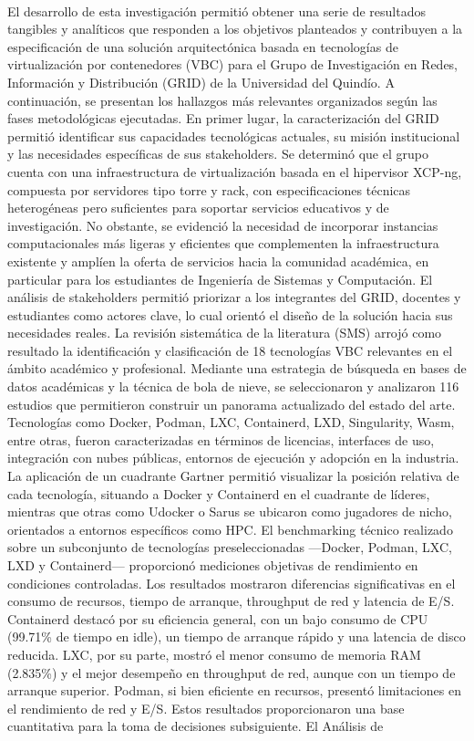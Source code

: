 \label{cap:resultados}
\mbox{}\\
El desarrollo de esta investigación permitió obtener una serie de resultados tangibles y analíticos que responden a los objetivos planteados y contribuyen a la especificación de una solución arquitectónica basada en tecnologías de virtualización por contenedores (VBC) para el Grupo de Investigación en Redes, Información y Distribución (GRID) de la Universidad del Quindío. A continuación, se presentan los hallazgos más relevantes organizados según las fases metodológicas ejecutadas. En primer lugar, la caracterización del GRID permitió identificar sus capacidades tecnológicas actuales, su misión institucional y las necesidades específicas de sus stakeholders. Se determinó que el grupo cuenta con una infraestructura de virtualización basada en el hipervisor XCP-ng, compuesta por servidores tipo torre y rack, con especificaciones técnicas heterogéneas pero suficientes para soportar servicios educativos y de investigación. No obstante, se evidenció la necesidad de incorporar instancias computacionales más ligeras y eficientes que complementen la infraestructura existente y amplíen la oferta de servicios hacia la comunidad académica, en particular para los estudiantes de Ingeniería de Sistemas y Computación. El análisis de stakeholders permitió priorizar a los integrantes del GRID, docentes y estudiantes como actores clave, lo cual orientó el diseño de la solución hacia sus necesidades reales. La revisión sistemática de la literatura (SMS) arrojó como resultado la identificación y clasificación de 18 tecnologías VBC relevantes en el ámbito académico y profesional. Mediante una estrategia de búsqueda en bases de datos académicas y la técnica de bola de nieve, se seleccionaron y analizaron 116 estudios que permitieron construir un panorama actualizado del estado del arte. Tecnologías como Docker, Podman, LXC, Containerd, LXD, Singularity, Wasm, entre otras, fueron caracterizadas en términos de licencias, interfaces de uso, integración con nubes públicas, entornos de ejecución y adopción en la industria. La aplicación de un cuadrante Gartner permitió visualizar la posición relativa de cada tecnología, situando a Docker y Containerd en el cuadrante de líderes, mientras que otras como Udocker o Sarus se ubicaron como jugadores de nicho, orientados a entornos específicos como HPC. El benchmarking técnico realizado sobre un subconjunto de tecnologías preseleccionadas —Docker, Podman, LXC, LXD y Containerd— proporcionó mediciones objetivas de rendimiento en condiciones controladas. Los resultados mostraron diferencias significativas en el consumo de recursos, tiempo de arranque, throughput de red y latencia de E/S. Containerd destacó por su eficiencia general, con un bajo consumo de CPU (99.71\% de tiempo en idle), un tiempo de arranque rápido y una latencia de disco reducida. LXC, por su parte, mostró el menor consumo de memoria RAM (2.835\%) y el mejor desempeño en throughput de red, aunque con un tiempo de arranque superior. Podman, si bien eficiente en recursos, presentó limitaciones en el rendimiento de red y E/S. Estos resultados proporcionaron una base cuantitativa para la toma de decisiones subsiguiente. El Análisis de 